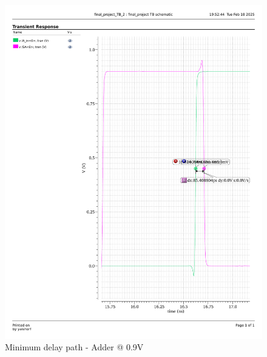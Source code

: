 \documentclass[a4paper,12pt]{article}
\begin{document}
\begin{figure}[H]
    \centering
    \begin{minipage}{0.49\textwidth}
        \centering
        \includegraphics[width=\textwidth]{delay/CP_min_add_0.9.pdf}
        \caption{Minimum delay path - Adder @ 0.9V}
    \end{minipage}
    \hfill
    \begin{minipage}{0.49\textwidth}
        \centering

\end{minipage}
\end{figure}
\end{document}
